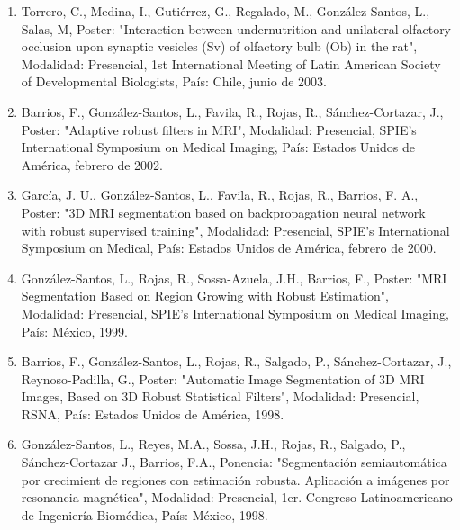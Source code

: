 \begin{enumerate}
\item Torrero, C., Medina, I., Gutiérrez, G., Regalado, M., González-Santos, L., Salas, M, Poster: "Interaction between 
undernutrition and unilateral olfactory occlusion upon synaptic vesicles (Sv) of olfactory bulb (Ob) in the rat", 
Modalidad: Presencial, 1st International Meeting of Latin American Society of Developmental Biologists, País: Chile, junio de 2003.

\item Barrios, F., González-Santos, L., Favila, R., Rojas, R., Sánchez-Cortazar, J., Poster: "Adaptive robust filters in 
MRI", Modalidad: Presencial, SPIE's International Symposium on Medical Imaging, País: Estados Unidos de América, febrero de 2002.

\item García, J. U., González-Santos, L., Favila, R., Rojas, R., Barrios, F. A., Poster: "3D MRI segmentation based on 
backpropagation neural network with robust supervised training", Modalidad: Presencial, SPIE's International Symposium on 
Medical, País: Estados Unidos de América, febrero de 2000.

\item González-Santos, L., Rojas, R., Sossa-Azuela, J.H., Barrios, F., Poster: "MRI Segmentation Based on Region Growing with 
Robust Estimation", Modalidad: Presencial, SPIE's International Symposium on Medical Imaging, País: México, 1999.

\item Barrios, F., González-Santos, L., Rojas, R., Salgado, P., Sánchez-Cortazar, J., Reynoso-Padilla, G., Poster: "Automatic 
Image Segmentation of 3D MRI Images, Based on 3D Robust Statistical Filters", Modalidad: Presencial, RSNA, País: Estados 
Unidos de América, 1998.

\item González-Santos, L., Reyes, M.A., Sossa, J.H., Rojas, R., Salgado, P., Sánchez-Cortazar J., Barrios, F.A., Ponencia: 
"Segmentación semiautomática por crecimient de regiones con estimación robusta. Aplicación a imágenes por resonancia 
magnética", Modalidad: Presencial, 1er. Congreso Latinoamericano de Ingeniería Biomédica, País: México, 1998.

\end{enumerate}



